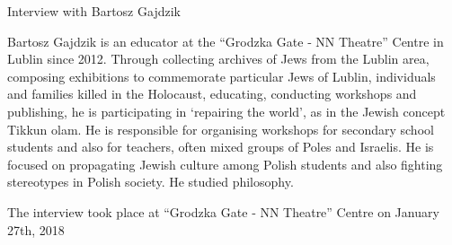 Interview with Bartosz Gajdzik 

Bartosz Gajdzik is an educator at the “Grodzka Gate ‐ NN Theatre” Centre in Lublin since 2012. Through collecting archives of Jews from the Lublin area, composing exhibitions to commemorate particular Jews of Lublin, individuals and families killed in the Holocaust, educating, conducting workshops and publishing, he is participating in ‘repairing the world’, as in the Jewish concept Tikkun olam. He is responsible for organising workshops for secondary school students and also for teachers, often mixed groups of Poles and Israelis. He is focused on propagating Jewish culture among Polish students and also fighting stereotypes in Polish society. He studied philosophy. 

The interview took place at “Grodzka Gate ‐ NN Theatre” Centre on January 27th, 2018 

